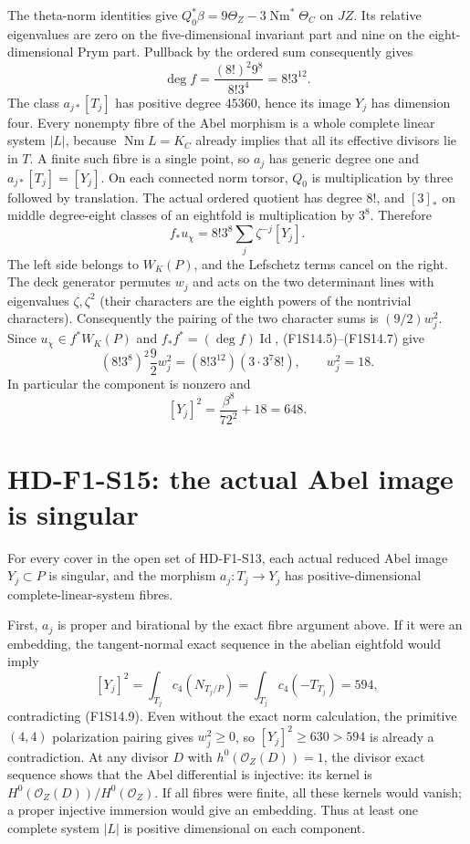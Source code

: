 The theta-norm identities give
$Q_0^*\beta=9\Theta_Z-3\operatorname{Nm}^*\Theta_C$ on $JZ$.
Its relative eigenvalues are zero on the five-dimensional invariant
part and nine on the eight-dimensional Prym part. Pullback by the
ordered sum consequently gives
\[
 \deg f=\frac{(8!)^2 9^8}{8!3^4}=8!3^{12}.
 \tag{F1S14.6}
\]
The class $a_{j*}[T_j]$ has positive degree $45360$, hence its image
$Y_j$ has dimension four. Every nonempty fibre of the Abel morphism is
a whole complete linear system $|L|$, because $\operatorname{Nm}L=K_C$
already implies that all its effective divisors lie in $T$.
A finite such fibre is a single point, so $a_j$ has generic degree one
and $a_{j*}[T_j]=[Y_j]$. On each connected norm torsor, $Q_0$ is
multiplication by three followed by translation. The actual ordered
quotient has degree $8!$, and $[3]_*$ on middle degree-eight classes of
an eightfold is multiplication by $3^8$. Therefore
\[
               f_*u_\chi=8!3^8\sum_j\zeta^{-j}[Y_j].
 \tag{F1S14.7}
\]
The left side belongs to $W_K(P)$, and the Lefschetz terms cancel on the
right. The deck generator permutes $w_j$ and acts on the two determinant
lines with eigenvalues $\zeta,\zeta^2$ (their characters are the eighth
powers of the nontrivial characters). Consequently the pairing of the
two character sums is $(9/2)w_j^2$. Since $u_\chi\in f^*W_K(P)$ and
$f_*f^*=(\deg f)\operatorname{Id}$, (F1S14.5)--(F1S14.7) give
\[
 (8!3^8)^2\frac92w_j^2=(8!3^{12})(3\cdot3^7 8!),
          \qquad w_j^2=18.
 \tag{F1S14.8}
\]
In particular the component is nonzero and
\[
                 [Y_j]^2=\frac{\beta^8}{72^2}+18=648.
 \tag{F1S14.9}
\]

\section{HD-F1-S15: the actual Abel image is singular}
\label{sec:f1-norm-fourfold-singular-image}

For every cover in the open set of HD-F1-S13, each actual reduced Abel
image $Y_j\subset P$ is singular, and the morphism $a_j:T_j\to Y_j$
has positive-dimensional complete-linear-system fibres.

First, $a_j$ is proper and birational by the exact fibre argument above.
If it were an embedding, the tangent-normal exact sequence in the
abelian eightfold would imply
\[
 [Y_j]^2=\int_{T_j}c_4(N_{T_j/P})
               =\int_{T_j}c_4(-T_{T_j})=594,
\]
contradicting (F1S14.9). Even without the exact norm calculation, the
primitive $(4,4)$ polarization pairing gives $w_j^2\geq0$, so
$[Y_j]^2\geq630>594$ is already a contradiction.
At any divisor $D$ with $h^0(\mathcal O_Z(D))=1$, the divisor exact
sequence shows that the Abel differential is injective: its kernel is
$H^0(\mathcal O_Z(D))/H^0(\mathcal O_Z)$. If all fibres were finite,
all these kernels would vanish; a proper injective immersion would give
an embedding. Thus at least one complete system $|L|$ is positive
dimensional on each component.

